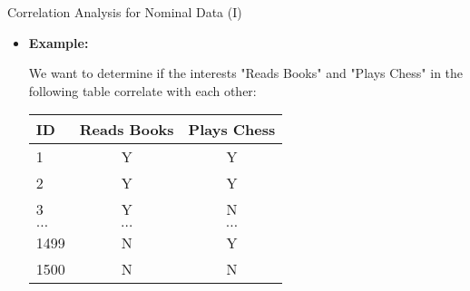 \begin{frame}{Correlation Analysis for Nominal Data (I)}
	\begin{itemize}
		\item \textbf{Example:}

		      We want to determine if the interests "Reads Books" and
		      "Plays Chess" in the following table correlate with each other:

		      \vspace{5mm}

		      \begin{center}
			      \begin{tabular}{|l|c|c|}
				      \hline
				      ID       & Reads Books & Plays Chess
				      \\\hline
				      1        & Y           & Y
				      \\\hline
				      2        & Y           & Y
				      \\\hline
				      3        & Y           & N
				      \\\hline
				      $\ldots$ & $\ldots$    & $\ldots$
				      \\\hline
				      1499     & N           & Y
				      \\\hline
				      1500     & N           & N
				      \\\hline
			      \end{tabular}
		      \end{center}
	\end{itemize}
\end{frame}

